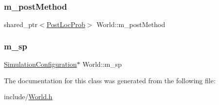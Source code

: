 \mbox{\label{class_world_a434bcb4c18cc7b3194d1ea6c09b76284}} 
\subsubsection{\texorpdfstring{m\+\_\+post\+Method}{m\_postMethod}}
{\footnotesize\ttfamily shared\+\_\+ptr$<$\hyperlink{class_post_loc_prob}{Post\+Loc\+Prob}$>$ World\+::m\+\_\+post\+Method\hspace{0.3cm}{\ttfamily [private]}}

\mbox{\label{class_world_ac1da5b3ecad51c54f1ff0c8e8c0fb611}} 
\subsubsection{\texorpdfstring{m\+\_\+sp}{m\_sp}}
{\footnotesize\ttfamily \hyperlink{class_simulation_configuration}{Simulation\+Configuration}$\ast$ World\+::m\+\_\+sp\hspace{0.3cm}{\ttfamily [private]}}



The documentation for this class was generated from the following file\+:\begin{DoxyCompactItemize}
\item 
include/\hyperlink{_world_8h}{World.\+h}\end{DoxyCompactItemize}
